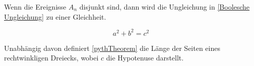 \label{ch:Aufgabenstellung}


Wenn die Ereignisse $A_n$ disjunkt sind, dann wird die Ungleichung
in \autoref{Boolesche Ungleichung} zu einer Gleichheit. 

\begin{equation}\label{pythTheorem}
  a^2+b^2=c^2
\end{equation}

Unabhängig davon definiert \autoref{pythTheorem} die Länge der Seiten eines rechtwinkligen Dreiecks, wobei $c$ die Hypotenuse darstellt. 
